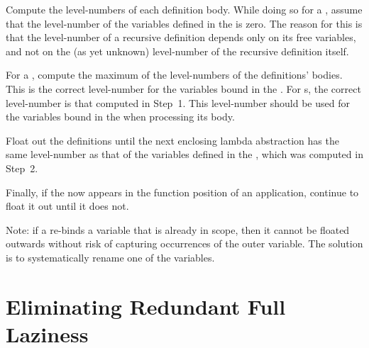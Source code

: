 	\vs
\begin{compactenum}[(1)]
    \item Compute the level-numbers of each definition body. While doing so for
    a , assume that the level-number of the variables defined in the
     is zero. The reason for this is that the level-number of a recursive
    definition depends only on its free variables, and not on the (as yet
    unknown) level-number of the recursive definition itself.

    \item For a , compute the maximum of the level-numbers of the
    definitions' bodies. This is the correct level-number for the variables
    bound in the . For s, the correct level-number is that computed
    in Step~1. This level-number should be used for the variables bound in
    the  when processing its body.

    \item Float out the definitions until the next enclosing lambda abstraction has
    the same level-number as that of the variables defined in the ,
    which was computed in Step~2.

    \item Finally, if the  now appears in the function position of an
    application, continue to float it out until it does not.
\end{compactenum}
\vs

\noindent
Note: if a  re-binds a variable that is already in scope, then it cannot be
floated outwards without risk of capturing occurrences of the outer variable.
The solution is to systematically rename one of the variables.

\section{Eliminating Redundant Full Laziness}

